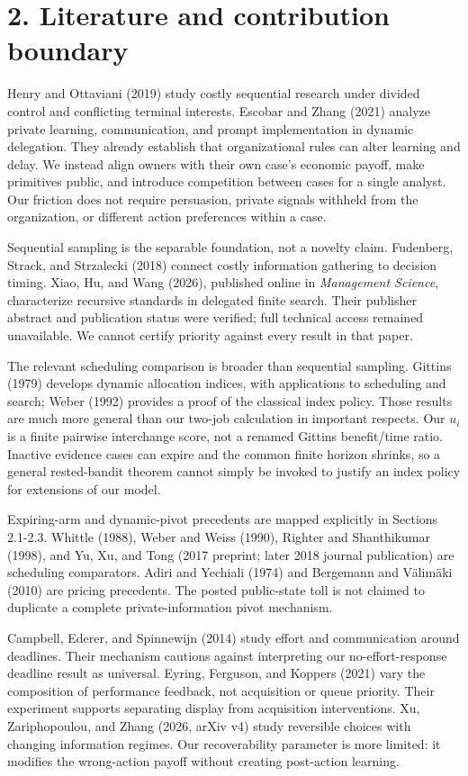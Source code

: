\documentclass[
  11pt,
]{article}
\begin{document}
\section{2. Literature and contribution
boundary}\label{literature-and-contribution-boundary}

Henry and Ottaviani (2019) study costly sequential research under
divided control and conflicting terminal interests. Escobar and Zhang
(2021) analyze private learning, communication, and prompt
implementation in dynamic delegation. They already establish that
organizational rules can alter learning and delay. We instead align
owners with their own case's economic payoff, make primitives public,
and introduce competition between cases for a single analyst. Our
friction does not require persuasion, private signals withheld from the
organization, or different action preferences within a case.

Sequential sampling is the separable foundation, not a novelty claim.
Fudenberg, Strack, and Strzalecki (2018) connect costly information
gathering to decision timing. Xiao, Hu, and Wang (2026), published
online in \emph{Management Science}, characterize recursive standards in
delegated finite search. Their publisher abstract and publication status
were verified; full technical access remained unavailable. We cannot
certify priority against every result in that paper.

The relevant scheduling comparison is broader than sequential sampling.
Gittins (1979) develops dynamic allocation indices, with applications to
scheduling and search; Weber (1992) provides a proof of the classical
index policy. Those results are much more general than our two-job
calculation in important respects. Our \(u_i\) is a finite pairwise
interchange score, not a renamed Gittins benefit/time ratio. Inactive
evidence cases can expire and the common finite horizon shrinks, so a
general rested-bandit theorem cannot simply be invoked to justify an
index policy for extensions of our model.

Expiring-arm and dynamic-pivot precedents are mapped explicitly in
Sections 2.1-2.3. Whittle (1988), Weber and Weiss (1990), Righter and
Shanthikumar (1998), and Yu, Xu, and Tong (2017 preprint; later 2018
journal publication) are scheduling comparators. Adiri and Yechiali
(1974) and Bergemann and Välimäki (2010) are pricing precedents. The
posted public-state toll is not claimed to duplicate a complete
private-information pivot mechanism.

Campbell, Ederer, and Spinnewijn (2014) study effort and communication
around deadlines. Their mechanism cautions against interpreting our
no-effort-response deadline result as universal. Eyring, Ferguson, and
Koppers (2021) vary the composition of performance feedback, not
acquisition or queue priority. Their experiment supports separating
display from acquisition interventions. Xu, Zariphopoulou, and Zhang
(2026, arXiv v4) study reversible choices with changing information
regimes. Our recoverability parameter is more limited: it modifies the
wrong-action payoff without creating post-action learning.
\end{document}
